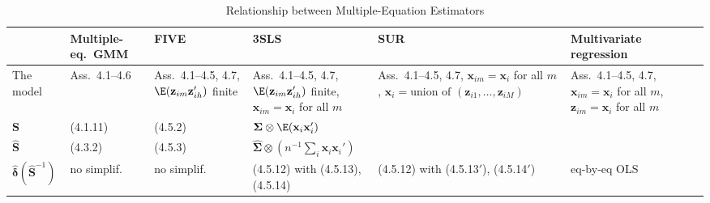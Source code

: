 \begin{table}[htbp]
\centering
\caption{Relationship between Multiple-Equation Estimators}
\label{tab:4.2}
\small
\medskip
\begin{tabular}{@{}p{2cm}p{1.6cm}p{1.6cm}p{2cm}p{1.8cm}p{2cm}@{}}
\toprule
& Multiple-eq.\ GMM & FIVE & 3SLS & SUR & Multivariate regression \\
\midrule
The model
& Ass.\ 4.1--4.6
& Ass.\ 4.1--4.5, 4.7, $\E(\mathbf{z}_{im}\mathbf{z}_{ih}')$ finite
& Ass.\ 4.1--4.5, 4.7, $\E(\mathbf{z}_{im}\mathbf{z}_{ih}')$ finite,
$\mathbf{x}_{im} = \mathbf{x}_i$ for all $m$
& Ass.\ 4.1--4.5, 4.7, $\mathbf{x}_{im} = \mathbf{x}_i$ for all $m$,
$\mathbf{x}_i = \text{union of } (\mathbf{z}_{i1}, \ldots, \mathbf{z}_{iM})$
& Ass.\ 4.1--4.5, 4.7, $\mathbf{x}_{im} = \mathbf{x}_i$ for all $m$,
$\mathbf{z}_{im} = \mathbf{x}_i$ for all $m$ \\
\midrule
$\mathbf{S}$ & (4.1.11) & (4.5.2) & \multicolumn{3}{l}{$\boldsymbol{\Sigma} \otimes \E(\mathbf{x}_i \mathbf{x}_i')$} \\[3pt]
$\widehat{\mathbf{S}}$ & (4.3.2) & (4.5.3) & \multicolumn{3}{l}{$\widehat{\boldsymbol{\Sigma}} \otimes (n^{-1} \sum_i \mathbf{x}_i \mathbf{x}_i')$} \\[3pt]
$\hat{\boldsymbol{\delta}}(\widehat{\mathbf{S}}^{-1})$
& no simplif.
& no simplif.
& (4.5.12) with (4.5.13), (4.5.14)
& (4.5.12) with (4.5.13$'$), (4.5.14$'$)
& eq-by-eq OLS \\
\bottomrule
\end{tabular}
\end{table}
